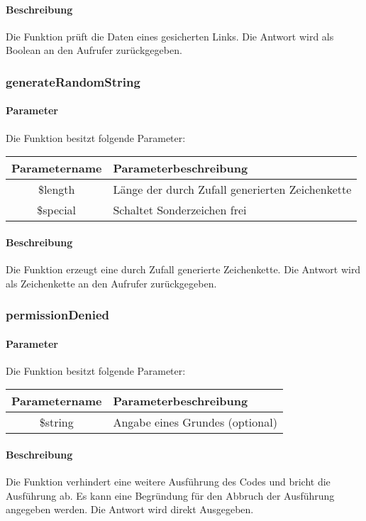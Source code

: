\paragraph{Beschreibung} Die Funktion prüft die Daten eines gesicherten Links. Die Antwort wird als Boolean an den Aufrufer zurückgegeben.
\subsubsection{generateRandomString}
\paragraph{Parameter} Die Funktion besitzt folgende Parameter:
\begin{table}[H]
	\begin{tabular}{|c|p{11cm}|}
		\hline
		\textbf{Parametername} & \textbf{Parameterbeschreibung} \\ \hline
		\$length  & Länge der durch Zufall generierten Zeichenkette \\ \hline
		\$special & Schaltet Sonderzeichen frei \\ \hline
	\end{tabular}
\end{table}
\paragraph{Beschreibung} Die Funktion erzeugt eine durch Zufall generierte Zeichenkette. Die Antwort wird als Zeichenkette an den Aufrufer zurückgegeben.
\subsubsection{permissionDenied}
\paragraph{Parameter} Die Funktion besitzt folgende Parameter:
\begin{table}[H]
	\begin{tabular}{|c|p{11cm}|}
		\hline
		\textbf{Parametername} & \textbf{Parameterbeschreibung} \\ \hline
		\$string & Angabe eines Grundes (optional) \\ \hline
	\end{tabular}
\end{table}
\paragraph{Beschreibung} Die Funktion verhindert eine weitere Ausführung des Codes und bricht die Ausführung ab. Es kann eine Begründung für den Abbruch der Ausführung angegeben werden. Die Antwort wird direkt Ausgegeben.
